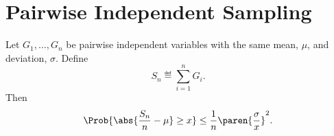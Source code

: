 \documentclass[handout]{mcs}
\begin{document}






\section*{Pairwise Independent Sampling}

\begin{theorem*}
Let $G_1, \dots, G_n$ be pairwise independent variables with the same
mean, $\mu$, and deviation, $\sigma$.  Define
\[
S_n \eqdef \sum_{i=1}^n G_i.
\]
Then
\[
\Prob{\abs{\frac{S_n}{n} - \mu} \geq x}
    \leq \frac{1}{n} \paren{\frac{\sigma}{x}}^2.
\]
\end{theorem*}
\end{document}
